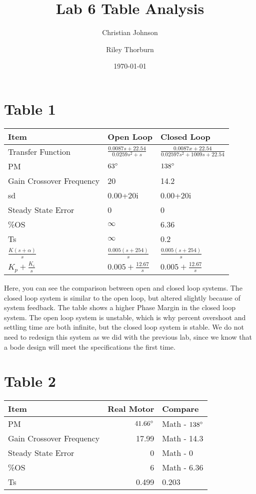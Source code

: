 \documentclass[11pt]{article}
\author{Christian Johnson \and Riley Thorburn}
\date{\today}
\title{Lab 6 Table Analysis}
\begin{document}
\maketitle

\section{Table 1}
\label{sec:orgb231272}

\begin{center}
\begin{tabular}{lll}
Item & Open Loop & Closed Loop\\[0pt]
\hline
Transfer Function & \(\frac{0.0087s+22.54}{0.0259s^2+s}\) & \(\frac{0.0087x+22.54}{0.02597s^2+1009s+22.54}\)\\[0pt]
PM & \(63\degree\) & \(138\degree\)\\[0pt]
Gain Crossover Frequency & 20 & 14.2\\[0pt]
sd & 0.00+20i & 0.00+20i\\[0pt]
Steady State Error & 0 & 0\\[0pt]
\%OS & \(\infty\) & 6.36\\[0pt]
Ts & \(\infty\) & 0.2\\[0pt]
\(\frac{K(s+\alpha)}{s}\) & \(\frac{0.005(s+254)}{s}\) & \(\frac{0.005(s+254)}{s}\)\\[0pt]
\(K_p+\frac{K_i}{s}\) & \(0.005+\frac{12.67}{s}\) & \(0.005+\frac{12.67}{s}\)\\[0pt]
\end{tabular}
\end{center}


Here, you can see the comparison between open and closed loop systems. The closed loop system is similar to the open loop, but altered slightly because of system feedback. The table shows a higher Phase Margin in the closed loop system. The open loop system is unstable, which is why percent overshoot and settling time are both infinite, but the closed loop system is stable. We do not need to redesign this system as we did with the previous lab, since we know that a bode design will meet the specifications the first time.

\section{Table 2}
\label{sec:orgf43f9cf}

\begin{center}
\begin{tabular}{lrl}
Item & Real Motor & Compare\\[0pt]
\hline
PM & \(41.66\degree\) & Math - \(138\degree\)\\[0pt]
Gain Crossover Frequency & 17.99 & Math - 14.3\\[0pt]
Steady State Error & 0 & Math - 0\\[0pt]
\%OS & 6 & Math - 6.36\\[0pt]
Ts & 0.499 & 0.203\\[0pt]
\end{tabular}
\end{center}
\end{document}
